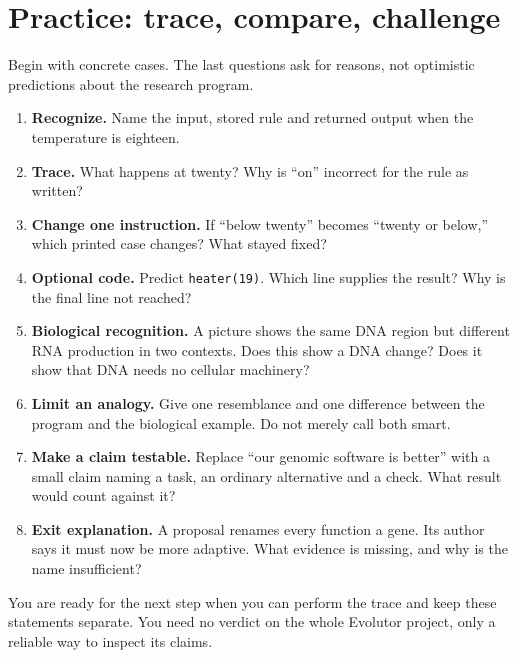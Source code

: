 \section{Practice: trace, compare, challenge}\label{sec:practice}
Begin with concrete cases. The last questions ask for reasons, not optimistic predictions about the research program.
\begin{enumerate}
\item \textbf{Recognize.} Name the input, stored rule and returned output when the temperature is eighteen.
\item \textbf{Trace.} What happens at twenty? Why is “on” incorrect for the rule as written?
\item \textbf{Change one instruction.} If “below twenty” becomes “twenty or below,” which printed case changes? What stayed fixed?
\item \textbf{Optional code.} Predict \texttt{heater(19)}. Which line supplies the result? Why is the final line not reached?
\item \textbf{Biological recognition.} A picture shows the same DNA region but different RNA production in two contexts. Does this show a DNA change? Does it show that DNA needs no cellular machinery?
\item \textbf{Limit an analogy.} Give one resemblance and one difference between the program and the biological example. Do not merely call both smart.
\item \textbf{Make a claim testable.} Replace “our genomic software is better” with a small claim naming a task, an ordinary alternative and a check. What result would count against it?
\item \textbf{Exit explanation.} A proposal renames every function a gene. Its author says it must now be more adaptive. What evidence is missing, and why is the name insufficient?
\end{enumerate}
You are ready for the next step when you can perform the trace and keep these statements separate. You need no verdict on the whole Evolutor project, only a reliable way to inspect its claims.

\clearpage
